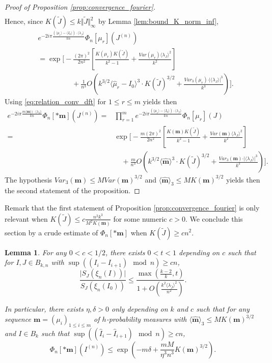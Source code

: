\documentclass[10pt,11pt]{amsart}%
\newtheorem{lemma}[theorem]{Lemma}
\begin{document}
\begin{proof}[Proof of Proposition \ref{prop:convergence_fourier}]
\begin{align*}
\end{align*}
Hence, since $K(\tilde{J})\leq k\Vert \tilde{J}\Vert_{\infty}^2$ by Lemma \ref{lem:bound_K_norm_inf},
\begin{align*}
&e^{-2i\pi\frac{(\langle\mu_r\rangle-\langle I_0\rangle)\cdot\langle \lambda_J\rangle}{kn}}\Phi_{n}[\mu_r](J^{(n)})\\
&=\exp\Bigg[-\frac{(2\pi)^2}{2n^2}\left[\frac{K(\mu_r)K(\tilde{J})}{k^2-1}+\frac{Var(\mu_r)\langle \lambda_J\rangle^2}{k^2}\right]\\
&\hspace{2cm}+\frac{1}{n^3}O\left(k^{3/2}\langle\hat{\mu}_r-I_0\rangle^3\cdot K(\tilde{J})^{3/2}+\frac{Var_3(\mu_r)\cdot\vert\langle \lambda_J\rangle\vert^3}{k^3}\right)\Bigg].
\end{align*}
Using \eqref{eq:relation_conv_dft} for $1\leq r\leq m$ yields then 
\begin{align*}
e^{-2i \pi \frac{m\langle\mathbf{m}\rangle)\cdot\langle \lambda_J\rangle}{kn}}\Phi_{n}[*\mathbf{m}](J^{(n)})
=&\prod_{r=1}^me^{-2i\pi\frac{(\langle\mu_r\rangle-\langle I_0\rangle)\cdot\langle \lambda_J\rangle}{kn}}\Phi_{n}[\mu_r](J)\nonumber\\
=&\exp\Bigg[-\frac{m(2\pi)^2}{2n^2}\left[\frac{K(\mathbf{m})K(\tilde{J})}{k^2-1}+\frac{Var(\mathbf{m})\langle \lambda_J\rangle^2}{k^2}\right]\nonumber\\
&\quad+\frac{m}{n^3}O\left(k^{3/2}\langle\hat{\mathbf{m}}\rangle^3\cdot K(\tilde{J})^{3/2}+\frac{Var_3(\mathbf{m})\cdot\vert\langle \lambda_J\rangle\vert^3}{k^3}\right)\Bigg].
\end{align*}
The hypothesis $Var_{3}(\mathbf{m})\leq M Var(\mathbf{m})^{3/2}$ and $\langle\hat{\mathbf{m}}\rangle_3\leq M K(\mathbf{m})^{3/2}$ yields then the second statement of the proposition.
\end{proof}
Remark that the first statement of Proposition \ref{prop:convergence_fourier} is only relevant when $K(\tilde{J})\leq c\frac{n^2k^3}{M^2K(\mathbf{m})}$ for some numeric $c>0$. We conclude this section by a crude estimate of $\Phi_n[*\mathbf{m}]$ when $K(\tilde{J})\geq cn^2$.
\begin{lemma}\label{lem:bound_Fourier_large}
For any $0<c<1/2$, there exists $0<t<1$ depending on $c$ such that for $I,J\in B_{k,n}$ with $\sup( (I_i-I_{i+1}) \mod n)\geq cn$, 
$$\frac{\vert S_{J}(\xi_{n}(I))\vert}{S_{J}(\xi_{n}(I_0))}\leq \frac{\max\left(\frac{k-2}{k},t\right)}{1+O\left(\frac{k^2\langle \lambda_{\hat{J}}\rangle^2}{n^2}\right)}.$$

In particular, there exists $\eta,\delta>0$ only depending on $k$ and $c$ such that for any sequence $\mathbf{m}=(\mu_i)_{1\leq i\leq m}$ of $h$-probability measures with $\langle\hat{\mathbf{m}}\rangle_3\leq MK(\mathbf{m})^{3/2}$ and $I\in B_{k}$ such that  $\sup( (\hat{I}_i-\hat{I}_{i+1}) \mod n)\geq cn$,
$$\Phi_{n}[*\mathbf{m}](I^{(n)})\leq \exp\left(-m\delta+ \frac{m M}{\eta^3n^3}K(\mathbf{m})^{3/2}\right).$$
\end{lemma}
\end{document}
